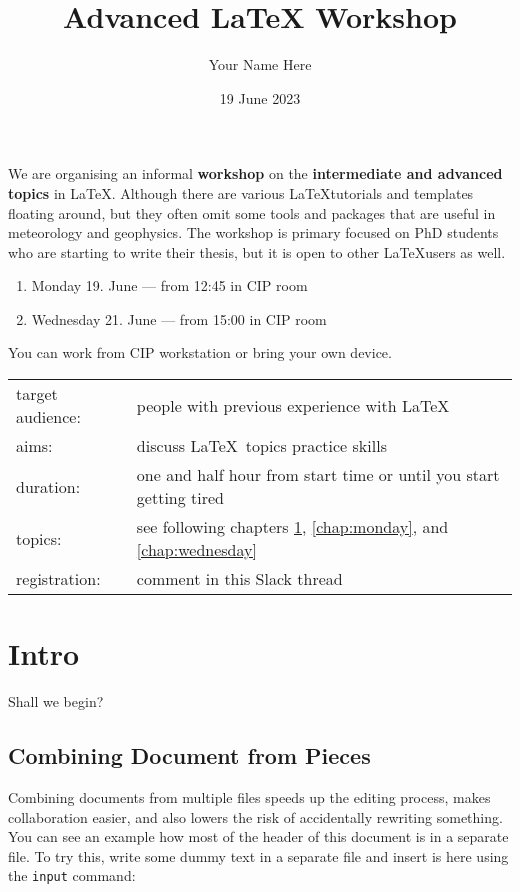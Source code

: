 \documentclass[a4paper,10pt]{report} %
\title{Advanced LaTeX Workshop}
\author{Your Name Here}
\date{19 June 2023}
\begin{document}
 \thispagestyle{plain} 
 \setcounter{page}{1}
 We are organising an informal \textbf{workshop} on the \textbf{intermediate and advanced topics} in \LaTeX.
Although there are various \LaTeX tutorials and templates floating around, but they often omit some tools and packages that are useful in meteorology and geophysics. The workshop is primary focused on PhD students who are starting to write their thesis, but it is open to other \LaTeX users as well.
 \begin{enumerate}
 \item  Monday 19. June --- from 12:45 in CIP room 
 \item  Wednesday 21. June --- from 15:00 in CIP room
\end{enumerate}

\noindent
You can work from CIP workstation or bring your own device.~\\

 \begin{tabular}{l p{}}
   target audience: & people with previous experience with \LaTeX \\
   aims:  & discuss \LaTeX ~topics practice skills \\
   duration: & one and half hour from start time or until you start getting tired \\
   topics: & see following chapters \ref{chap:intro}, \ref{chap:monday}, and \ref{chap:wednesday} \\
   registration: & comment in this Slack thread \\ 
 \end{tabular}

\maketitle
 
\chapter{Intro} \label{chap:intro}

\setcounter{page}{3} 

Shall we begin?

\section{Combining Document from Pieces}
Combining documents from multiple files speeds up the editing process, makes collaboration easier, and also lowers the risk of accidentally rewriting something. You can see an example how most of the header of this document is in a separate file.
To try this, write some dummy text in a separate file and insert is here using the \texttt{input} command:\\
% 
\end{document}
